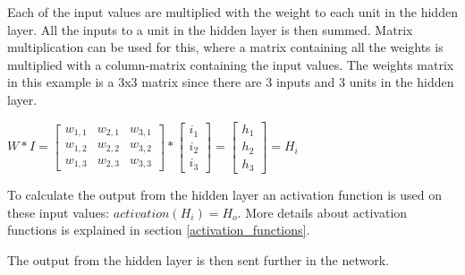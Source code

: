 Each of the input values are multiplied with the weight to each unit in the hidden layer. All the inputs to a unit in the hidden layer is then summed. Matrix multiplication can be used for this, where a matrix containing all the weights is multiplied with a column-matrix containing the input values. The weights matrix in this example is a 3x3 matrix since there are 3 inputs and 3 units in the hidden layer.

\begin{center}
$
W * I = 
\begin{bmatrix} 
w_{1,1} & w_{2,1} & w_{3,1}\\
w_{1,2} & w_{2,2} & w_{3,2}\\
w_{1,3} & w_{2,3} & w_{3,3}
\end{bmatrix}
*
\begin{bmatrix} 
i_1\\
i_2\\
i_3
\end{bmatrix}
=
\begin{bmatrix} 
h_1\\
h_2\\
h_3
\end{bmatrix}
=
H_i
$
\end{center}

To calculate the output from the hidden layer an activation function is used on these input values: $activation(H_i) = H_o$. More details about activation functions is explained in section \ref{activation_functions}.


The output from the hidden layer is then sent further in the network.


